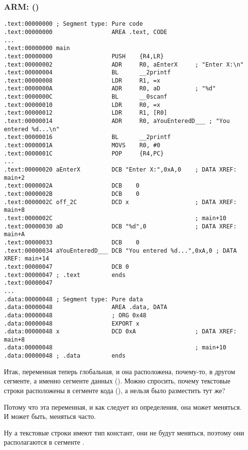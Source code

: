 \subsubsection{ARM: \OptimizingKeilVI (\ThumbMode)}

\begin{lstlisting}
.text:00000000 ; Segment type: Pure code
.text:00000000                 AREA .text, CODE
...
.text:00000000 main
.text:00000000                 PUSH    {R4,LR}
.text:00000002                 ADR     R0, aEnterX     ; "Enter X:\n"
.text:00000004                 BL      __2printf
.text:00000008                 LDR     R1, =x
.text:0000000A                 ADR     R0, aD          ; "%d"
.text:0000000C                 BL      __0scanf
.text:00000010                 LDR     R0, =x
.text:00000012                 LDR     R1, [R0]
.text:00000014                 ADR     R0, aYouEnteredD___ ; "You entered %d...\n"
.text:00000016                 BL      __2printf
.text:0000001A                 MOVS    R0, #0
.text:0000001C                 POP     {R4,PC}
...
.text:00000020 aEnterX         DCB "Enter X:",0xA,0    ; DATA XREF: main+2
.text:0000002A                 DCB    0
.text:0000002B                 DCB    0
.text:0000002C off_2C          DCD x                   ; DATA XREF: main+8
.text:0000002C                                         ; main+10
.text:00000030 aD              DCB "%d",0              ; DATA XREF: main+A
.text:00000033                 DCB    0
.text:00000034 aYouEnteredD___ DCB "You entered %d...",0xA,0 ; DATA XREF: main+14
.text:00000047                 DCB 0
.text:00000047 ; .text         ends
.text:00000047
...
.data:00000048 ; Segment type: Pure data
.data:00000048                 AREA .data, DATA
.data:00000048                 ; ORG 0x48
.data:00000048                 EXPORT x
.data:00000048 x               DCD 0xA                 ; DATA XREF: main+8
.data:00000048                                         ; main+10
.data:00000048 ; .data         ends
\end{lstlisting}

Итак, переменная  теперь глобальная, и она расположена, почему-то, в другом сегменте, а именно сегменте данных ().
Можно спросить, почему текстовые строки расположены в сегменте кода (), а  нельзя было разместить тут же?

Потому что эта переменная, и как следует из определения, она может меняться. И может быть, меняться часто.

Ну а текстовые строки имеют тип констант, они не будут меняться, поэтому они располагаются в сегменте .

